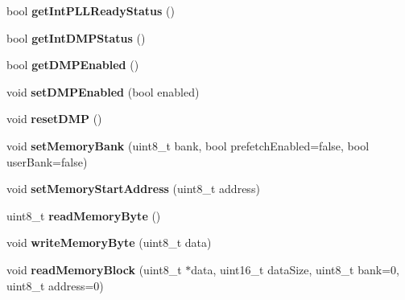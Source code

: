 \begin{DoxyCompactItemize}
\item 
\hypertarget{class_m_p_u6050_a559de8cd420d329c93f215938e8483e2}{bool {\bfseries get\+Int\+P\+L\+L\+Ready\+Status} ()}\label{class_m_p_u6050_a559de8cd420d329c93f215938e8483e2}

\item 
\hypertarget{class_m_p_u6050_a715e66c52a2272b54782058772b50d61}{bool {\bfseries get\+Int\+D\+M\+P\+Status} ()}\label{class_m_p_u6050_a715e66c52a2272b54782058772b50d61}

\item 
\hypertarget{class_m_p_u6050_a2a17e3062b1f321d260fd70f308c6a06}{bool {\bfseries get\+D\+M\+P\+Enabled} ()}\label{class_m_p_u6050_a2a17e3062b1f321d260fd70f308c6a06}

\item 
\hypertarget{class_m_p_u6050_abb6bf6db86b84700c7f13bd838d63755}{void {\bfseries set\+D\+M\+P\+Enabled} (bool enabled)}\label{class_m_p_u6050_abb6bf6db86b84700c7f13bd838d63755}

\item 
\hypertarget{class_m_p_u6050_a7a9706f177e84b295739198e6b2ded95}{void {\bfseries reset\+D\+M\+P} ()}\label{class_m_p_u6050_a7a9706f177e84b295739198e6b2ded95}

\item 
\hypertarget{class_m_p_u6050_aa0c1753f6d2dacb1942fbef156a075bc}{void {\bfseries set\+Memory\+Bank} (uint8\+\_\+t bank, bool prefetch\+Enabled=false, bool user\+Bank=false)}\label{class_m_p_u6050_aa0c1753f6d2dacb1942fbef156a075bc}

\item 
\hypertarget{class_m_p_u6050_a45013abb39103e858d432cc720bc351a}{void {\bfseries set\+Memory\+Start\+Address} (uint8\+\_\+t address)}\label{class_m_p_u6050_a45013abb39103e858d432cc720bc351a}

\item 
\hypertarget{class_m_p_u6050_a4fb50ebcff2f4e686e3fbbafb70a1f75}{uint8\+\_\+t {\bfseries read\+Memory\+Byte} ()}\label{class_m_p_u6050_a4fb50ebcff2f4e686e3fbbafb70a1f75}

\item 
\hypertarget{class_m_p_u6050_a20de45af9109402f0cfe785f8fdbf439}{void {\bfseries write\+Memory\+Byte} (uint8\+\_\+t data)}\label{class_m_p_u6050_a20de45af9109402f0cfe785f8fdbf439}

\item 
\hypertarget{class_m_p_u6050_a04d8d5e7b62605aed15f07f52afa74ca}{void {\bfseries read\+Memory\+Block} (uint8\+\_\+t $\ast$data, uint16\+\_\+t data\+Size, uint8\+\_\+t bank=0, uint8\+\_\+t address=0)}\label{class_m_p_u6050_a04d8d5e7b62605aed15f07f52afa74ca}


\end{DoxyCompactItemize}
